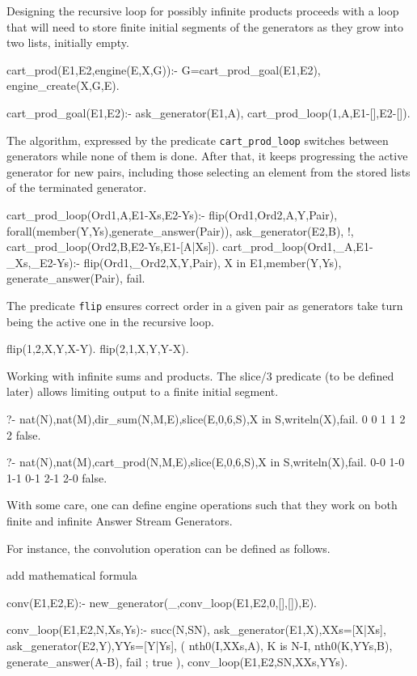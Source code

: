 \documentclass{new_tlp}
\begin{document}
Designing the recursive loop for possibly infinite products
proceeds with a loop that will need to store finite initial 
segments of the generators as they grow into two lists, initially
empty.
\begin{code}
cart_prod(E1,E2,engine(E,X,G)):-
  G=cart_prod_goal(E1,E2),
  engine_create(X,G,E).

cart_prod_goal(E1,E2):-
  ask_generator(E1,A),
  cart_prod_loop(1,A,E1-[],E2-[]).
\end{code}

The algorithm, expressed by the predicate {\tt cart\_prod\_loop}
switches between generators while none of them is done.
After that, it keeps progressing the active generator 
for new pairs, including those selecting an element 
from the stored lists of the terminated generator.
\begin{code}
cart_prod_loop(Ord1,A,E1-Xs,E2-Ys):-
  flip(Ord1,Ord2,A,Y,Pair),
  forall(member(Y,Ys),generate_answer(Pair)),
  ask_generator(E2,B),
  !,
  cart_prod_loop(Ord2,B,E2-Ys,E1-[A|Xs]).
cart_prod_loop(Ord1,_A,E1-_Xs,_E2-Ys):-
  flip(Ord1,_Ord2,X,Y,Pair),
  X in E1,member(Y,Ys),
  generate_answer(Pair),
  fail.
\end{code}

The predicate {\tt flip} ensures correct order in a given pair
as  generators take turn being the active one in the recursive loop. 
\begin{code} 
flip(1,2,X,Y,X-Y).
flip(2,1,X,Y,Y-X).
\end{code}

\BX
Working with infinite sums and products. The slice/3 predicate (to be defined later) allows limiting output to a finite initial segment.
\begin{codex}
?- nat(N),nat(M),dir_sum(N,M,E),slice(E,0,6,S),X in S,writeln(X),fail.
0
0
1
1
2
2
false.

?- nat(N),nat(M),cart_prod(N,M,E),slice(E,0,6,S),X in S,writeln(X),fail.
0-0
1-0
1-1
0-1
2-1
2-0
false.
\end{codex}
\EX


With some care, one can define engine operations such that they work on both
finite and infinite Answer Stream Generators.

For instance, the convolution operation can be defined as follows.


{\Large add mathematical formula}

\begin{code}

conv(E1,E2,E):-
  new_generator(_,conv_loop(E1,E2,0,[],[]),E).

conv_loop(E1,E2,N,Xs,Ys):-
  succ(N,SN),
  ask_generator(E1,X),XXs=[X|Xs],
  ask_generator(E2,Y),YYs=[Y|Ys],
  ( nth0(I,XXs,A),
    K is N-I,
    nth0(K,YYs,B),
    generate_answer(A-B),
    fail
  ; true  
  ),
  conv_loop(E1,E2,SN,XXs,YYs).
\end{code}
\end{document}
